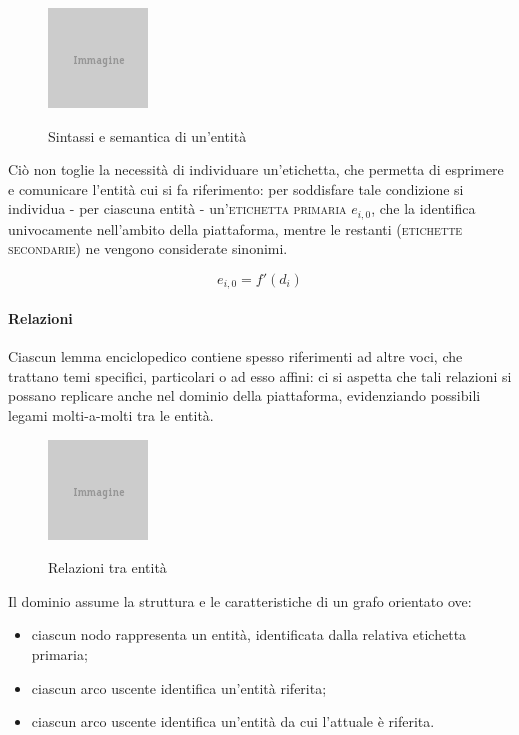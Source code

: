 \begin{figure}[ht]
\begin{center}
\includegraphics{placeholder.png}
\label{fig:tesi:stage:fase-uno:entita-sintassi-semantica}
\caption{Sintassi e semantica di un'entità}
\end{center}
\end{figure}

Ciò non toglie la necessità di individuare un'etichetta, che permetta di esprimere e comunicare l'entità cui si fa riferimento: per soddisfare tale condizione si individua - per ciascuna entità - un'\textsc{etichetta primaria} $e_{i,0}$, che la identifica univocamente nell'ambito della piattaforma, mentre le restanti (\textsc{etichette secondarie}) ne vengono considerate sinonimi.

\begin{equation}
e_{i,0} = f'(d_i)
\end{equation}

\paragraph{Relazioni}
Ciascun lemma enciclopedico contiene spesso riferimenti ad altre voci, che trattano temi specifici, particolari o ad esso affini: ci si aspetta che tali relazioni si possano replicare anche nel dominio della piattaforma, evidenziando possibili legami molti-a-molti tra le entità.

\begin{figure}[ht]
\begin{center}
\includegraphics{placeholder.png}
\label{fig:tesi:stage:fase-uno:entita-relazioni}
\caption{Relazioni tra entità}
\end{center}
\end{figure}

Il dominio assume la struttura e le caratteristiche di un grafo orientato ove:
\begin{itemize}
\item ciascun nodo rappresenta un entità, identificata dalla relativa etichetta primaria;
\item ciascun arco uscente identifica un'entità riferita;
\item ciascun arco uscente identifica un'entità da cui l'attuale è riferita.
\end{itemize}

